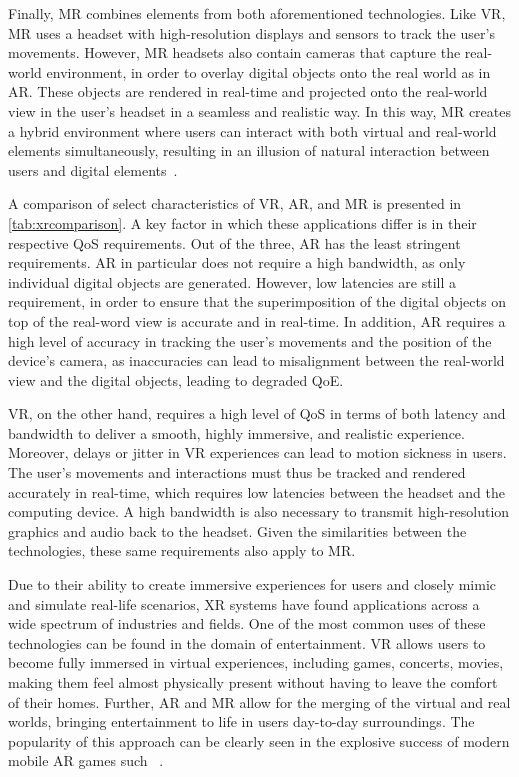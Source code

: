 Finally, \gls{MR} combines elements from both aforementioned technologies.
Like \gls{VR}, \gls{MR} uses a headset with high-resolution displays and sensors to track the user's movements.
However, \gls{MR} headsets also contain cameras that capture the real-world environment, in order to overlay digital objects onto the real world as in \gls{AR}.
These objects are rendered in real-time and projected onto the real-world view in the user's headset in a seamless and realistic way.
In this way, \gls{MR} creates a hybrid environment where users can interact with both virtual and real-world elements simultaneously, resulting in an illusion of natural interaction between users and digital elements~\cite{speicher2019mixed}.



A comparison of select characteristics of \gls{VR}, \gls{AR}, and \gls{MR} is presented in \cref{tab:xrcomparison}.
A key factor in which these applications differ is in their respective \gls{QoS} requirements.
Out of the three, \gls{AR} has the least stringent requirements.
\gls{AR} in particular does not require a high bandwidth, as only individual digital objects are generated.
However, low latencies are still a requirement, in order to ensure that the superimposition of the digital objects on top of the real-word view is accurate and in real-time.
In addition, \gls{AR} requires a high level of accuracy in tracking the user's movements and the position of the device's camera, as inaccuracies can lead to misalignment between the real-world view and the digital objects, leading to degraded \gls{QoE}.

\gls{VR}, on the other hand, requires a high level of \gls{QoS} in terms of both latency and bandwidth to deliver a smooth, highly immersive, and realistic experience.
Moreover, delays or jitter in \gls{VR} experiences can lead to motion sickness in users.
The user's movements and interactions must thus be tracked and rendered accurately in real-time, which requires low latencies between the headset and the computing device.
A high bandwidth is also necessary to transmit high-resolution graphics and audio back to the headset.
Given the similarities between the technologies, these same requirements also apply to \gls{MR}.

\medskip

Due to their ability to create immersive experiences for users and closely mimic and simulate real-life scenarios, \gls{XR} systems have found applications across a wide spectrum of industries and fields.
One of the most common uses of these technologies can be found in the domain of entertainment.
\gls{VR} allows users to become fully immersed in virtual experiences, including games, concerts, movies, making them feel almost physically present without having to leave the comfort of their homes.
Further, \gls{AR} and \gls{MR} allow for the merging of the virtual and real worlds, bringing entertainment to life in users day-to-day surroundings.
The popularity of this approach can be clearly seen in the explosive success of modern mobile \gls{AR} games such ~\cite{pokemongo}.

